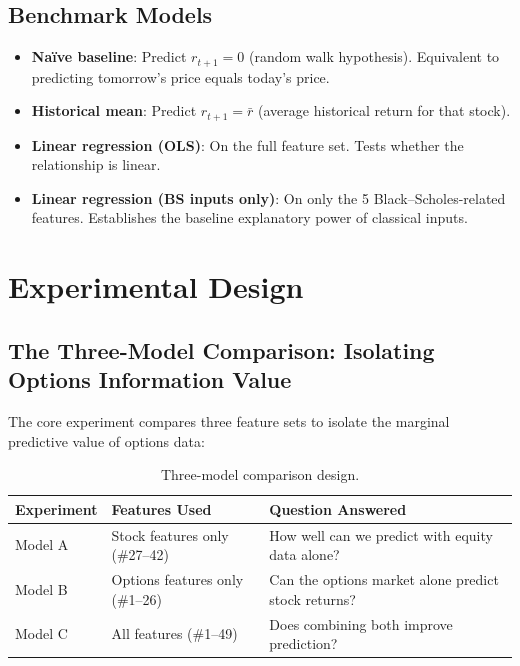 \documentclass[11pt,a4paper]{article}
\begin{document}
\subsection{Benchmark Models}

\begin{itemize}[nosep]
    \item \textbf{Na\"ive baseline}: Predict $r_{t+1} = 0$ (random walk hypothesis). Equivalent to predicting tomorrow's price equals today's price.
    \item \textbf{Historical mean}: Predict $r_{t+1} = \bar{r}$ (average historical return for that stock).
    \item \textbf{Linear regression (OLS)}: On the full feature set. Tests whether the relationship is linear.
    \item \textbf{Linear regression (BS inputs only)}: On only the 5 Black--Scholes-related features. Establishes the baseline explanatory power of classical inputs.
\end{itemize}


\section{Experimental Design}

\subsection{The Three-Model Comparison: Isolating Options Information Value}

The core experiment compares three feature sets to isolate the marginal predictive value of options data:

\begin{table}[H]
\centering
\begin{tabularx}{\textwidth}{@{}lXl@{}}
\toprule
\textbf{Experiment} & \textbf{Features Used} & \textbf{Question Answered} \\
\midrule
Model A & Stock features only (\#27--42) & How well can we predict with equity data alone? \\
Model B & Options features only (\#1--26) & Can the options market alone predict stock returns? \\
Model C & All features (\#1--49) & Does combining both improve prediction? \\
\bottomrule
\end{tabularx}
\caption{Three-model comparison design.}
\end{table}
\end{document}
